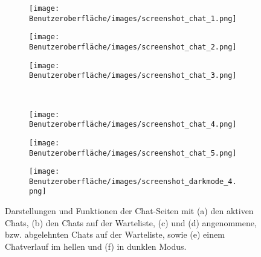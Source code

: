 \begin{figure}[H]
	\begin{subfigure}{0.33\textwidth}
	\centering
	\texttt{[image: Benutzeroberfläche/images/screenshot\_chat\_1.png]}
	\caption{}
	\label{fig:chat_a}
	\end{subfigure}
	\begin{subfigure}{0.33\textwidth}
	\centering
	\texttt{[image: Benutzeroberfläche/images/screenshot\_chat\_2.png]}
	\caption{}
	\label{fig:chat_b}
	\end{subfigure}
	\begin{subfigure}{0.33\textwidth}
	\centering
	\texttt{[image: Benutzeroberfläche/images/screenshot\_chat\_3.png]}
	\caption{}
	\label{fig:chat_c}
	\end{subfigure}\\ \vspace{1cm}	
	
	\begin{subfigure}{0.33\textwidth}
	\centering
	\texttt{[image: Benutzeroberfläche/images/screenshot\_chat\_4.png]}
	\caption{}
	\label{fig:chat_d}
	\end{subfigure}
	\begin{subfigure}{0.33\textwidth}
	\centering
	\texttt{[image: Benutzeroberfläche/images/screenshot\_chat\_5.png]}
	\caption{}
	\label{fig:chat_e}
	\end{subfigure}
	\begin{subfigure}{0.33\textwidth}
	\centering
	\texttt{[image: Benutzeroberfläche/images/screenshot\_darkmode\_4.png]}
	\caption{}
	\label{fig:chat_f}
	\end{subfigure}
\caption[Screenshots der Chat-Seiten]{Darstellungen und Funktionen der Chat-Seiten mit (a) den aktiven Chats, (b) den Chats auf der Warteliste, (c) und (d) angenommene, bzw. abgelehnten Chats auf der Warteliste, sowie (e) einem Chatverlauf im hellen und (f) in dunklen Modus.}
\label{fig:chat_alle}
\end{figure}
